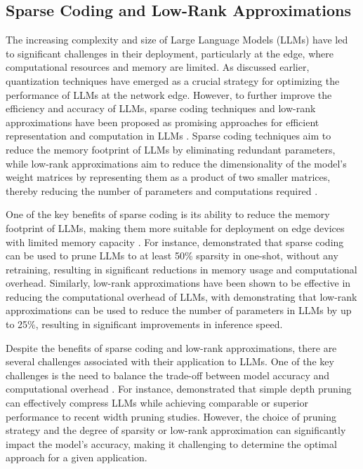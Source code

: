 \documentclass[11pt,a4paper]{article}
\begin{document}
\subsection{Sparse Coding and Low-Rank Approximations}


The increasing complexity and size of Large Language Models (LLMs) have led to significant challenges in their deployment, particularly at the edge, where computational resources and memory are limited. As discussed earlier, quantization techniques have emerged as a crucial strategy for optimizing the performance of LLMs at the network edge. However, to further improve the efficiency and accuracy of LLMs, sparse coding techniques and low-rank approximations have been proposed as promising approaches for efficient representation and computation in LLMs \cite{doi:10.18653/v1/2020.emnlp-main.496}. Sparse coding techniques aim to reduce the memory footprint of LLMs by eliminating redundant parameters, while low-rank approximations aim to reduce the dimensionality of the model's weight matrices by representing them as a product of two smaller matrices, thereby reducing the number of parameters and computations required \cite{doi:10.18653/v1/2020.findings-emnlp.286}.

One of the key benefits of sparse coding is its ability to reduce the memory footprint of LLMs, making them more suitable for deployment on edge devices with limited memory capacity \cite{arxiv:2403.03853}. For instance, \cite{arxiv:2301.00774} demonstrated that sparse coding can be used to prune LLMs to at least 50\% sparsity in one-shot, without any retraining, resulting in significant reductions in memory usage and computational overhead. Similarly, low-rank approximations have been shown to be effective in reducing the computational overhead of LLMs, with \cite{arxiv:2401.15024} demonstrating that low-rank approximations can be used to reduce the number of parameters in LLMs by up to 25\%, resulting in significant improvements in inference speed.

Despite the benefits of sparse coding and low-rank approximations, there are several challenges associated with their application to LLMs. One of the key challenges is the need to balance the trade-off between model accuracy and computational overhead \cite{arxiv:2306.11695}. For instance, \cite{arxiv:2402.02834} demonstrated that simple depth pruning can effectively compress LLMs while achieving comparable or superior performance to recent width pruning studies. However, the choice of pruning strategy and the degree of sparsity or low-rank approximation can significantly impact the model's accuracy, making it challenging to determine the optimal approach for a given application.
\end{document}

